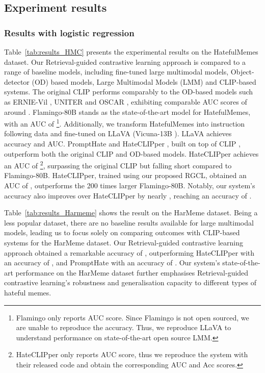 \documentclass[11pt]{article}
\begin{document}
\subsection{Experiment results} 
\subsubsection{Results with logistic regression}
Table~\ref{tab:results_HMC} presents the experimental results on the HatefulMemes dataset.
Our Retrieval-guided contrastive learning approach is compared to a range of baseline models, including fine-tuned large multimodal models, Object-detector (OD) based models, Large Multimodal Models (LMM) and CLIP-based systems. The original CLIP \cite{clip2021} performs comparably to the OD-based models such as ERNIE-Vil \cite{ErnieViL2020}, UNITER \cite{Uniter2019} and OSCAR \cite{li2020oscar}, exhibiting comparable AUC scores of around . Flamingo-80B \cite{Flamingo22} stands as the state-of-the-art model for HatefulMemes, with an AUC of \footnote{Flamingo only reports AUC score. Since Flamingo is not open sourced, we are unable to reproduce the accuracy. Thus, we reproduce LLaVA to understand performance on state-of-the-art open source LMM.}. 
Additionally, we transform HatefulMemes into instruction following data and fine-tuned on LLaVA \cite{LiuLLAVA2023} (Vicuna-13B \citealp{vicuna2023}). LLaVA achieves  accuracy and  AUC.  
PromptHate \cite{caoPromptHate2022} and HateCLIPper \cite{KumarHateClip2022}, built on top of CLIP \cite{clip2021}, outperform both the original CLIP and OD-based models.
HateCLIPper achieves an AUC of \footnote{HateCLIPper only reports AUC score, thus we reproduce the system with their released code and obtain the corresponding AUC and Acc scores.}, surpassing the original CLIP but falling short compared to Flamingo-80B. 
HateCLIPper, trained using our proposed RGCL, obtained an AUC of , outperforms the 200 times larger Flamingo-80B. Notably, our system's accuracy also improves over HateCLIPper by nearly , reaching an accuracy of .



Table~\ref{tab:results_Harmeme} shows the result on the HarMeme dataset. Being a less popular dataset, there are no baseline results available for large multimodal models, leading us to focus solely on comparing outcomes with CLIP-based systems for the HarMeme dataset. 
Our Retrieval-guided contrastive learning approach obtained a remarkable accuracy of , outperforming HateCLIPper with an accuracy of , and PromptHate with an accuracy of . Our system's state-of-the-art performance on the HarMeme dataset further emphasises Retrieval-guided contrastive learning's robustness and generalisation capacity to different types of hateful memes.
\end{document}
